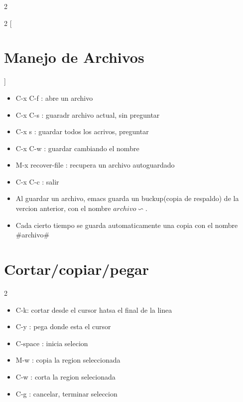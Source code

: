\documentclass[a4paper, twocolumn]{article}
\begin{document}
\begin{landscape}
\begin{multicols}{2}
\begin{multicols}{2}
[
\section*{Manejo de Archivos}
]
\begin{itemize}
	\item C-x C-f : abre un archivo
	\item C-x C-s : guaradr archivo actual, sin 			preguntar
	\item C-x s : guardar todos los acrivos, preguntar
	\item C-x C-w : guardar cambiando el nombre

	\item M-x recover-file : recupera un archivo 				autoguardado 	
	\item C-x C-c : salir

\end{itemize}


\end{multicols}
\begin{flushleft}
\begin{itemize}
	\item Al guardar un archivo, emacs guarda un 			buckup(copia de respaldo) de la vercion anterior, 	con el nombre $archivo\backsim$. 
	\item Cada cierto tiempo se guarda 						automaticamente una copia con el nombre \#archivo\#
\end{itemize}
\end{flushleft}

\section*{Cortar/copiar/pegar}
\begin{multicols}{2}
\begin{itemize}
	\item C-k: cortar desde el cursor hatsa el final de la linea
	\item C-y : pega donde esta el cursor
	\item C-space : inicia selecion
	\item M-w : copia la region seleccionada
	\item C-w : corta la region selecionada
	\item C-g : cancelar, terminar seleccion
\end{itemize}
\end{multicols}


\end{multicols}
\end{landscape}
\end{document}
